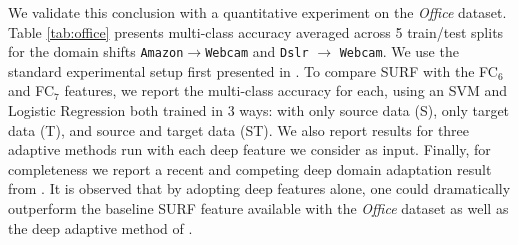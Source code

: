 We validate this conclusion with a quantitative experiment on the \textit{Office} dataset. Table \ref{tab:office} presents multi-class accuracy averaged across 5 train/test splits for the domain shifts \texttt{Amazon}$\rightarrow$\texttt{Webcam} and \texttt{Dslr} $\rightarrow$ \texttt{Webcam}. We use the standard experimental setup first presented in \cite{eccv_saenko}. To compare SURF with the FC$_6$ and FC$_7$ features, we report the multi-class accuracy for each, using an SVM and Logistic Regression both trained in 3 ways: with only source data (S), only target data (T), and source and target data (ST). We also report results for three adaptive methods run with each deep feature we consider as input. Finally, for completeness we report a recent and competing deep domain adaptation result from \cite{ref:dlid}. It is observed that by adopting deep features alone, one could dramatically outperform the baseline SURF feature available with the \textit{Office} dataset as well as the deep adaptive method of \cite{ref:dlid}. 


